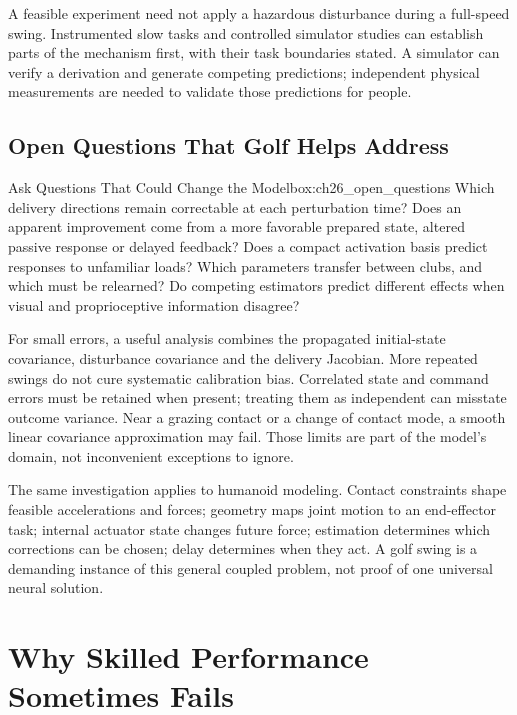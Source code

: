 A feasible experiment need not apply a hazardous disturbance during a full-speed swing. Instrumented slow tasks and controlled simulator studies can establish parts of the mechanism first, with their task boundaries stated. A simulator can verify a derivation and generate competing predictions; independent physical measurements are needed to validate those predictions for people.

\subsection{Open Questions That Golf Helps Address}
\label{subsec:ch26_open_questions}

\begin{principle}{Ask Questions That Could Change the Model}{box:ch26_open_questions}
Which delivery directions remain correctable at each perturbation time? Does an apparent improvement come from a more favorable prepared state, altered passive response or delayed feedback? Does a compact activation basis predict responses to unfamiliar loads? Which parameters transfer between clubs, and which must be relearned? Do competing estimators predict different effects when visual and proprioceptive information disagree?
\end{principle}

For small errors, a useful analysis combines the propagated initial-state covariance, disturbance covariance and the delivery Jacobian. More repeated swings do not cure systematic calibration bias. Correlated state and command errors must be retained when present; treating them as independent can misstate outcome variance. Near a grazing contact or a change of contact mode, a smooth linear covariance approximation may fail. Those limits are part of the model's domain, not inconvenient exceptions to ignore.

The same investigation applies to humanoid modeling. Contact constraints shape feasible accelerations and forces; geometry maps joint motion to an end-effector task; internal actuator state changes future force; estimation determines which corrections can be chosen; delay determines when they act. A golf swing is a demanding instance of this general coupled problem, not proof of one universal neural solution.

\section{Why Skilled Performance Sometimes Fails}
\label{sec:ch26_failures}

